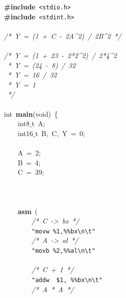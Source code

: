 \documentclass[a4paper,russian,cp1251]{article}
\begin{document}
\noindent
\mbox{}\textbf{\#include}\ \texttt{\textless{}stdio.h\textgreater{}} \\
\mbox{}\textbf{\#include}\ \texttt{\textless{}stdint.h\textgreater{}} \\
\mbox{} \\
\mbox{}\textit{/*\ Y\ =\ (1\ +\ C\ -\ 2A\textasciicircum{}2)\ /\ 2B\textasciicircum{}2\ */} \\
\mbox{} \\
\mbox{}\textit{/*\ Y\ =\ (1\ +\ 23\ -\ 2*2\textasciicircum{}2)\ /\ 2*4\textasciicircum{}2} \\
\mbox{}\textit{\ *\ Y\ =\ (24\ -\ 8)\ /\ 32} \\
\mbox{}\textit{\ *\ Y\ =\ 16\ /\ 32} \\
\mbox{}\textit{\ *\ Y\ =\ 1} \\
\mbox{}\textit{\ */} \\
\mbox{} \\
\mbox{}int\ \textbf{main}(void)\ \{ \\
\mbox{}\ \ \ \ int8$\_$t\ A; \\
\mbox{}\ \ \ \ int16$\_$t\ B,\ C,\ Y\ =\ 0; \\
\mbox{} \\
\mbox{}\ \ \ \ A\ =\ 2; \\
\mbox{}\ \ \ \ B\ =\ 4; \\
\mbox{}\ \ \ \ C\ =\ 39; \\
\mbox{} \\
\mbox{} \\
\mbox{} \\
\mbox{}\ \ \ \ \textbf{asm}\ ( \\
\mbox{}\ \ \ \ \ \ \ \ \textit{/*\ C\ -\textgreater{}\ bx\ */} \\
\mbox{}\ \ \ \ \ \ \ \ \texttt{"{}movw\ \%1,\%\%bx}\texttt{\textbackslash{}n\textbackslash{}t}\texttt{"{}} \\
\mbox{}\ \ \ \ \ \ \ \ \textit{/*\ A\ -\textgreater{}\ al\ */} \\
\mbox{}\ \ \ \ \ \ \ \ \texttt{"{}movb\ \%2,\%\%al}\texttt{\textbackslash{}n\textbackslash{}t}\texttt{"{}} \\
\mbox{} \\
\mbox{}\ \ \ \ \ \ \ \ \textit{/*\ C\ +\ 1\ */} \\
\mbox{}\ \ \ \ \ \ \ \ \texttt{"{}addw\ \ \$1,\ \%\%bx}\texttt{\textbackslash{}n\textbackslash{}t}\texttt{"{}} \\
\mbox{}\ \ \ \ \ \ \ \ \textit{/*\ A\ *\ A\ */} \\
\end{document}
